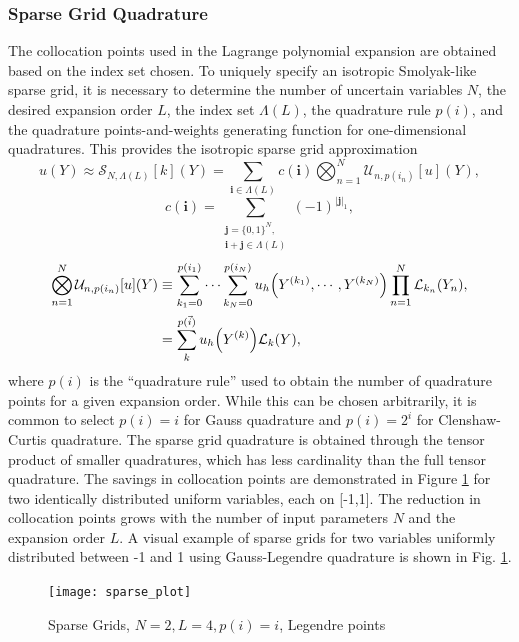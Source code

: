 \documentclass{mc2015}
\begin{document}
\subsubsection{Sparse Grid Quadrature}
The collocation points used in the Lagrange polynomial expansion are obtained based on the index set chosen.  To uniquely specify an isotropic Smolyak-like sparse grid, it is necessary to determine the number of uncertain variables $N$, the desired expansion order $L$, the index set $\Lambda(L)$, the quadrature rule $p(i)$, and the quadrature points-and-weights generating function for one-dimensional quadratures.
This provides the isotropic sparse grid approximation
\begin{equation}
u(Y)\approx\mathcal{S}_{N,\Lambda(L)}[k](Y)=\sum_{\boldsymbol{i}\in\Lambda(L)}c(\boldsymbol{i})\bigotimes_{n=1}^N\mathcal{U}_{n,p(i_n)}[u](Y),
\end{equation}
\begin{equation}
c(\boldsymbol{i})=\sum_{\substack{\boldsymbol{j}=\{0,1\}^N,\\ \boldsymbol{i}+\boldsymbol{j}\in\Lambda(L)}}(-1)^{|\boldsymbol{j}|_1},
\end{equation}
\begin{align}
\bigotimes_{n=1}^N\mathcal{U}_{n,p(i_n)}[u](Y)&\equiv\sum_{k_1=0}^{p(i_1)}\cdots\sum_{k_N=0}^{p(i_N)}u_h\qty(Y^{(k_1)},\cdots,Y^{(k_N)})\prod_{n=1}^N \mathcal{L}_{k_n}(Y_n),\\
  &=\sum_{k}^{p(\vec i)}u_h\qty(Y^{(k)})\mathcal{L}_k(Y),
\end{align}
where $p(i)$ is the ``quadrature rule'' used to obtain the number of quadrature points for a given expansion order.  While this can be chosen arbitrarily, it is common to select $p(i)=i$ for Gauss quadrature and $p(i)=2^i$ for Clenshaw-Curtis quadrature.
The sparse grid quadrature is obtained through the tensor product of smaller quadratures, which has less cardinality than the full tensor quadrature.  The savings in collocation points are demonstrated in Figure \ref{collsets} for two identically distributed uniform variables, each on [-1,1].  The reduction in collocation points grows with the number of input parameters $N$ and the expansion order $L$.
A visual example of sparse grids for two variables uniformly distributed between -1 and 1 using Gauss-Legendre quadrature is shown in Fig. \ref{collsets}.
\begin{figure}[H]
\centering
  \texttt{[image: sparse\_plot]}
  \caption{Sparse Grids, $N=2,L=4,p(i)=i$, Legendre points}
  \label{collsets}
\end{figure}
\end{document}
